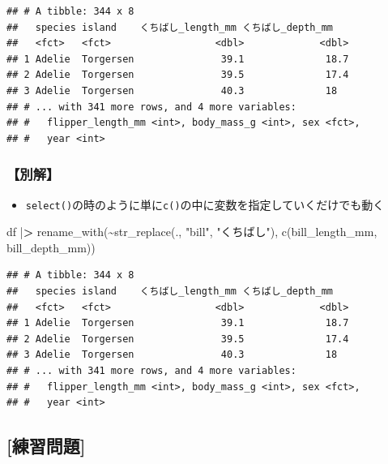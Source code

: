 \documentclass[
  xelatex,ja=standard, b5paper]{bxjsbook}
\newenvironment{Shaded}{\begin{snugshade}}{\end{snugshade}}
\newcommand{\ErrorTok}[1]{\textcolor[rgb]{0.64,0.00,0.00}{\textbf{#1}}}
\newcommand{\FunctionTok}[1]{\textcolor[rgb]{0.00,0.00,0.00}{#1}}
\newcommand{\NormalTok}[1]{#1}
\newcommand{\SpecialCharTok}[1]{\textcolor[rgb]{0.00,0.00,0.00}{#1}}
\newcommand{\StringTok}[1]{\textcolor[rgb]{0.31,0.60,0.02}{#1}}
\providecommand{\tightlist}{%
  \setlength{\itemsep}{0pt}\setlength{\parskip}{0pt}}
\begin{document}
\begin{verbatim}
## # A tibble: 344 x 8
##   species island    くちばし_length_mm くちばし_depth_mm
##   <fct>   <fct>                  <dbl>             <dbl>
## 1 Adelie  Torgersen               39.1              18.7
## 2 Adelie  Torgersen               39.5              17.4
## 3 Adelie  Torgersen               40.3              18  
## # ... with 341 more rows, and 4 more variables:
## #   flipper_length_mm <int>, body_mass_g <int>, sex <fct>,
## #   year <int>
\end{verbatim}

\hypertarget{rename-strreplace1-other}{%
\subsubsection{【別解】}\label{rename-strreplace1-other}}

\begin{itemize}
\tightlist
\item
  \texttt{select()}の時のように単に\texttt{c()}の中に変数を指定していくだけでも動く
\end{itemize}

\begin{Shaded}
\begin{Highlighting}[]
\NormalTok{df }\SpecialCharTok{|}\ErrorTok{\textgreater{}} 
  \FunctionTok{rename\_with}\NormalTok{(}\SpecialCharTok{\textasciitilde{}}\FunctionTok{str\_replace}\NormalTok{(., }\StringTok{"bill"}\NormalTok{, }\StringTok{"くちばし"}\NormalTok{),}
              \FunctionTok{c}\NormalTok{(bill\_length\_mm, bill\_depth\_mm))}
\end{Highlighting}
\end{Shaded}

\begin{verbatim}
## # A tibble: 344 x 8
##   species island    くちばし_length_mm くちばし_depth_mm
##   <fct>   <fct>                  <dbl>             <dbl>
## 1 Adelie  Torgersen               39.1              18.7
## 2 Adelie  Torgersen               39.5              17.4
## 3 Adelie  Torgersen               40.3              18  
## # ... with 341 more rows, and 4 more variables:
## #   flipper_length_mm <int>, body_mass_g <int>, sex <fct>,
## #   year <int>
\end{verbatim}

\hypertarget{ux7df4ux7fd2ux554fux984c-3}{%
\subsection{{[}練習問題{]}}\label{ux7df4ux7fd2ux554fux984c-3}}
\end{document}
